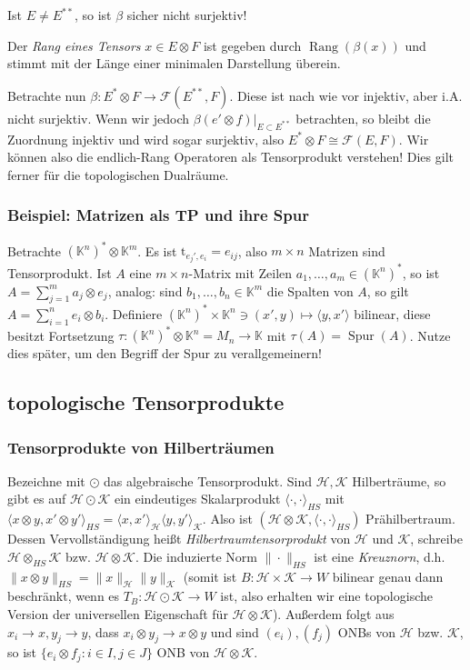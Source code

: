 \documentclass[11pt,a4paper]{scrartcl}
\newcommand{\K}{\mathbb{K}} %
\newcommand{\Hc}{\mathcal{H}}
\newcommand{\Kc}{\mathcal{K}}
\newcommand{\F}{\mathcal{F}}
\theoremstyle{plain}
\theoremstyle{definition}
\theoremstyle{remark}
\DeclareMathOperator{\Rang}{Rang}
\DeclareMathOperator{\Spur}{Spur}
\begin{document}
Ist $E\neq E^{**}$, so ist $\beta$ sicher nicht surjektiv!

Der \emph{Rang eines Tensors} $x\in E\otimes F$ ist gegeben durch $\Rang(\beta(x))$ und stimmt mit der Länge einer minimalen Darstellung überein.

Betrachte nun $\beta: E^*\otimes F \to \F(E^{**},F)$. Diese ist nach wie vor injektiv, aber i.A. nicht surjektiv. Wenn wir jedoch $\beta(e'\otimes f)|_{E\subset E^{**}}$ betrachten, so bleibt die Zuordnung injektiv und wird sogar surjektiv, also $E^*\otimes F \cong \F(E,F)$. Wir können also die endlich-Rang Operatoren als Tensorprodukt verstehen! Dies gilt ferner für die topologischen Dualräume.

\subsubsection{Beispiel: Matrizen als TP und ihre Spur}

Betrachte $(\K^n)^* \otimes \K^m$. Es ist $\mathrm{t}_{e_j',e_i}=e_{ij}$, also $m\times n$ Matrizen sind Tensorprodukt. Ist $A$ eine $m\times n$-Matrix mit Zeilen $a_1,\dots,a_m \in (\K^n)^*$, so ist $A=\sum_{j=1}^m a_j \otimes e_j$, analog: sind $b_1,\dots,b_n \in \K^m$ die Spalten von $A$, so gilt $A=\sum_{i=1}^n e_i \otimes b_i$. Definiere $(\K^n)^* \times \K^n \ni (x',y)\mapsto \langle y, x' \rangle$ bilinear, diese besitzt Fortsetzung $\tau: (\K^n)^*\otimes \K^n = M_n \to \K$ mit $\tau(A)=\Spur(A)$. Nutze dies später, um den Begriff der Spur zu verallgemeinern!

\subsection{topologische Tensorprodukte}

\subsubsection{Tensorprodukte von Hilberträumen}

Bezeichne mit $\odot$ das algebraische Tensorprodukt. Sind $\Hc,\Kc$ Hilberträume, so gibt es auf $\Hc\odot \Kc$ ein eindeutiges Skalarprodukt $\langle \cdot, \cdot \rangle_{HS}$ mit $\langle x\otimes y, x'\otimes y' \rangle_{HS} = \langle x,x' \rangle_\Hc \langle y, y' \rangle_\Kc$. Also ist $(\Hc\otimes \Kc, \langle \cdot, \cdot \rangle_{HS})$ Prähilbertraum. Dessen Vervollständigung heißt \emph{Hilbertraumtensorprodukt} von $\Hc$ und $\Kc$, schreibe $\Hc \otimes_{HS} \Kc$ bzw. $\Hc \otimes \Kc$. Die induzierte Norm $\|\cdot\|_{HS}$ ist eine \emph{Kreuznorn}, d.h. $\|x\otimes y\|_{HS}=\|x\|_\Hc \|y\|_\Kc$ (somit ist $B: \Hc \times \Kc \to W$ bilinear genau dann beschränkt, wenn es $T_B: \Hc \odot \Kc \to W$ ist, also erhalten wir eine topologische Version der universellen Eigenschaft für $\Hc \otimes \Kc$). Außerdem folgt aus $x_i \to x, y_j\to y$, dass $x_i \otimes y_j \to x\otimes y$ und sind $(e_i), (f_j)$ ONBs von $\Hc$ bzw. $\Kc$, so ist $\{ e_i \otimes f_j: i\in I, j\in J \}$ ONB von $\Hc\otimes \Kc$.
\end{document}
